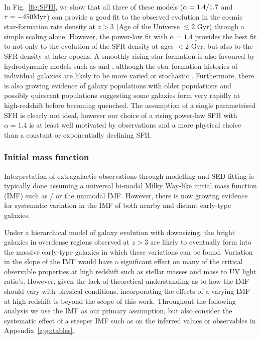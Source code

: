 In Fig.~\ref{fig:SFH}, we show that all three of these models ($\alpha \/ = \/ 1.4/1.7$ and $\tau = -450 \rm{Myr}$) can provide a good fit to the observed evolution in the cosmic star-formation rate density at $z > 3$ (Age of the Universe $\lesssim 2$ Gyr) through a simple scaling alone. However, the power-law fit with $\alpha = 1.4$ provides the best fit to not only to the evolution of the SFR-density at ages $< 2$ Gyr, but also to the SFR density at later epochs. A smoothly rising star-formation is also favoured by hydrodynamic models such as \citet{2011MNRAS.410.1703F} and \citet{Dayal:2013jm}, although the star-formation histories of individual galaxies are likely to be more varied or stochastic \citep{Dayal:2013jm,Kimm:2014gv}. Furthermore, there is also growing evidence of galaxy populations with older populations and possibly quiescent populations \citep{Nayyeri:2014cz,Spitler:2014ey} suggesting some galaxies form very rapidly at high-redshift before becoming quenched. The assumption of a single parametrised SFH is clearly not ideal, however our choice of a rising power-law SFH with $\alpha = 1.4$ is at least well motivated by observations and a more physical choice than a constant or exponentially declining SFH.
    
\subsubsection{Initial mass function}
Interpretation of extragalactic observations through modelling and SED fitting is typically done assuming a universal bi-modal Milky Way-like initial mass function (IMF) such as \citet{Kroupa:2001ki}/\citet{Chabrier:2003ki} or the unimodal \citet{Salpeter:1955hz} IMF. However, there is now growing evidence for systematic variation in the IMF of both nearby \citep{vanDokkum:2010ha,Treu:2010kf,Cappellari:2012jm,Conroy:2012bn,Ferreras:2013id} and distant \citep{MartinNavarro:2014wr} early-type galaxies. 

Under a hierarchical model of galaxy evolution with downsizing, the bright galaxies in overdense regions observed at $z > 3$ are likely to eventually form into the massive early-type galaxies in which these variations can be found. Variation in the slope of the IMF would have a significant effect on many of the critical observable properties at high redshift such as stellar masses and mass to UV light ratio's. However, given the lack of theoretical understanding as to how the IMF should vary with physical conditions, incorporating the effects of a varying IMF at high-redshift is beyond the scope of this work. Throughout the following analysis we use the \citet{Chabrier:2003ki} IMF as our primary assumption, but also consider the systematic effect of a steeper IMF such as \citet{Salpeter:1955hz} on the inferred values or observables in Appendix~\ref{app:tables}.
    
